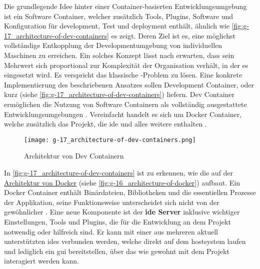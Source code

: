 Die grundlegende Idee hinter einer Container-basierten Entwicklungsumgebung ist ein Software Container, welcher zusätzlich Tools, Plugins, Software und Konfiguration für \Gls{development}, Test und \Gls{deployment} enthält, ähnlich wie \autoref{fig:g-17_architecture-of-dev-containers} es zeigt. Deren Ziel ist es, eine möglichst vollständige Entkopplung der Developmentumgebung von individuellen Maschinen zu erreichen. Ein solches Konzept lässt nach \citeauthor{014:Managing-Container-based-Software-Development-Environments} erwarten, dass sein Mehrwert sich proportional zur Komplexität der Organisation verhält, in der es eingesetzt wird. \cite{014:Managing-Container-based-Software-Development-Environments} Es verspricht das klassische -Problem zu lösen. \cite{204:Development-Containers-Simplified} Eine konkrete Implementierung des beschriebenen Ansatzes sollen Development Container, oder kurz  (siehe \autoref{fig:g-17_architecture-of-dev-containers}) liefern. Dev Container ermöglichen die Nutzung von Software Containern als vollständig ausgestattete Entwicklungsumgebungen \cite{303:Introduction-to-DevContainers,305:Using-DevContainers-in-JetBrains-IDEs,306:Development-Containers}. Vereinfacht handelt es sich um Docker Container, welche zusätzlich das Projekt, die \Gls{ide} und alles weitere enthalten \cite{305:Using-DevContainers-in-JetBrains-IDEs}.

\begin{figure}[h]
    \centering
    \texttt{[image: g-17\_architecture-of-dev-containers.png]}
    \caption{Architektur von Dev Containern}
    \label{fig:g-17_architecture-of-dev-containers}
\end{figure}

In \autoref{fig:g-17_architecture-of-dev-containers} ist zu erkennen, wie die  auf der \hyperref[fig:g-16_architecture-of-docker]{Architektur von Docker} (siehe \autoref{fig:g-16_architecture-of-docker}) aufbaut. Ein Docker Container enthält Binärdateien, Bibliotheken und die essentiellen Prozesse der Applikation, seine Funktionsweise unterscheidet sich nicht von der gewöhnlicher . Eine neue Komponente ist der \textbf{\Gls{ide} Server} inklusive wichtiger Einstellungen, Tools und Plugins, die für die Entwicklung an dem Projekt notwendig oder hilfreich sind. Er kann mit einer aus mehreren aktuell unterstützten \Glspl{ide} verbunden werden, welche direkt auf dem \Gls{hostsystem} laufen und lediglich ein \Gls{gui} bereitstellen, über das wie gewohnt mit dem Projekt interagiert werden kann.

